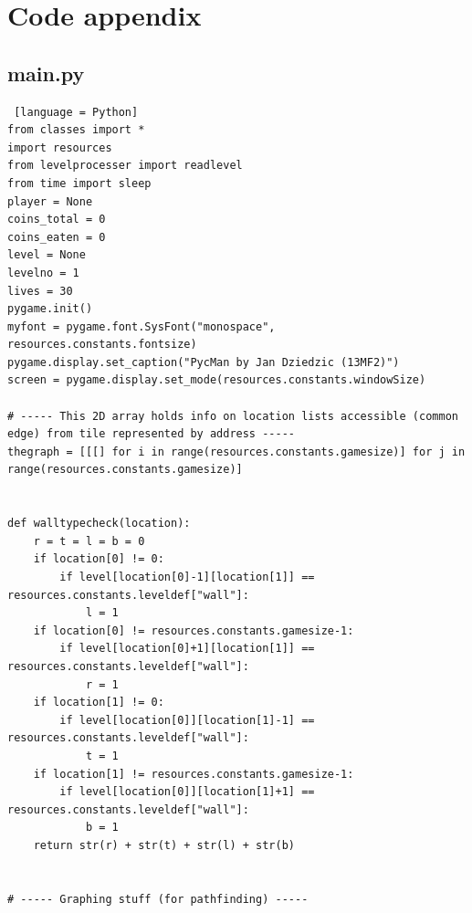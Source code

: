 \documentclass[11pt,a4paper,notitlepage]{report}
\begin{document}
	\chapter{Code appendix}
		\section{main.py}
			\begin{lstlisting} [language = Python]
from classes import *
import resources
from levelprocesser import readlevel
from time import sleep
player = None
coins_total = 0
coins_eaten = 0
level = None
levelno = 1
lives = 30
pygame.init()
myfont = pygame.font.SysFont("monospace", resources.constants.fontsize)
pygame.display.set_caption("PycMan by Jan Dziedzic (13MF2)")
screen = pygame.display.set_mode(resources.constants.windowSize)

# ----- This 2D array holds info on location lists accessible (common edge) from tile represented by address -----
thegraph = [[[] for i in range(resources.constants.gamesize)] for j in range(resources.constants.gamesize)]


def walltypecheck(location):
    r = t = l = b = 0
    if location[0] != 0:
        if level[location[0]-1][location[1]] == resources.constants.leveldef["wall"]:
            l = 1
    if location[0] != resources.constants.gamesize-1:
        if level[location[0]+1][location[1]] == resources.constants.leveldef["wall"]:
            r = 1
    if location[1] != 0:
        if level[location[0]][location[1]-1] == resources.constants.leveldef["wall"]:
            t = 1
    if location[1] != resources.constants.gamesize-1:
        if level[location[0]][location[1]+1] == resources.constants.leveldef["wall"]:
            b = 1
    return str(r) + str(t) + str(l) + str(b)


# ----- Graphing stuff (for pathfinding) -----



\end{lstlisting}
\end{document}

